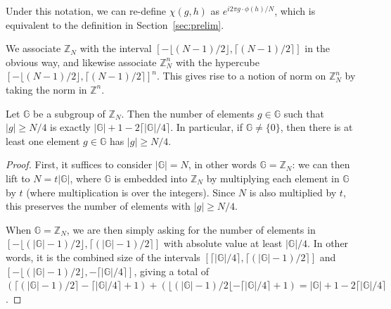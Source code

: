\documentclass{article}\usepackage[a4paper,margin=20mm]{geometry}
\numberwithin{theorem}{section}
\numberwithin{equation}{section}
\newcommand{\Z}{\mathbb{Z}}
\newcommand{\G}{\mathbb{G}}
\begin{document}
Under this notation, we can re-define $\chi(g,h)$ as $e^{i2\pi g\cdot\phi(h)/N}$, which is equivalent to the definition in Section~\ref{sec:prelim}.

We associate $\Z_N$ with the interval $[-\lfloor (N-1)/2\rfloor,\lceil (N-1)/2 \rceil]$ in the obvious way, and likewise associate $\Z_N^n$ with the hypercube $[-\lfloor (N-1)/2\rfloor,\lceil (N-1)/2 \rceil]^n$. This gives rise to a notion of norm on $\Z_N^n$ by taking the norm in $\Z^n$.

\begin{lemma}\label{lem:bigelements} Let $\G$ be a subgroup of $\Z_N$. Then the number of elements $g\in\G$ such that $|g|\geq N/4$ is exactly
	$|\G|+1-2\lceil|\G|/4\rceil$.
	In particular, if $\G\neq\{0\}$, then there is at least one element $g\in\G$ has $|g|\geq N/4$.
\end{lemma}
\begin{proof}First, it suffices to consider $|\G|=N$, in other words $\G=\Z_N$: we can then lift to $N=t|\G|$, where $\G$ is embedded into $\Z_N$ by multiplying each element in $\G$ by $t$ (where multiplication is over the integers). Since $N$ is also multiplied by $t$, this preserves the number of elements with $|g|\geq N/4$.
	
	When $\G=\Z_N$, we are then simply asking for the number of elements in $[-\lfloor (|\G|-1)/2\rfloor,\lceil (|\G|-1)/2 \rceil]$ with absolute value at least $|\G|/4$. In other words, it is the combined size of the intervals $[\lceil |\G|/4\rceil,\lceil (|\G|-1)/2 \rceil]$ and $[-\lfloor (|\G|-1)/2\rfloor,-\lceil |\G|/4\rceil]$, giving a total of $\left(\lceil (|\G|-1)/2 \rceil-\lceil |\G|/4\rceil+1\right)+\left(\lfloor (|\G|-1)/2 \lfloor-\lceil |\G|/4\rceil+1\right)=|\G|+1-2\lceil|\G|/4\rceil$.
\end{proof}
\end{document}
